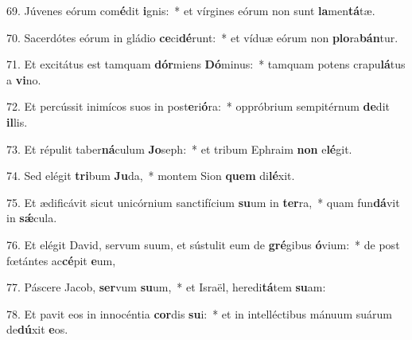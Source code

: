 69. Júvenes eórum com\textbf{é}dit \textbf{i}gnis:~*  et vírgines eórum non sunt \textbf{la}men\textbf{tá}tæ.\

70. Sacerdótes eórum in gládio \textbf{ce}ci\textbf{dé}runt:~*  et víduæ eórum non \textbf{plo}ra\textbf{bán}tur.\

71. Et excitátus est tamquam \textbf{dór}miens \textbf{Dó}minus:~*  tamquam potens crapu\textbf{lá}tus a \textbf{vi}no.\

72. Et percússit inimícos suos in post\textbf{e}ri\textbf{ó}ra:~*  oppróbrium sempitérnum \textbf{de}dit \textbf{il}lis.\

73. Et répulit taber\textbf{ná}culum \textbf{Jo}seph:~*  et tribum Ephraim \textbf{non} e\textbf{lé}git.\

74. Sed elégit \textbf{tri}bum \textbf{Ju}da,~*  montem Sion \textbf{quem} di\textbf{lé}xit.\

75. Et ædificávit sicut unicórnium sanctifícium \textbf{su}um in \textbf{ter}ra,~*  quam fun\textbf{dá}vit in \textbf{sǽ}cula.\

76. Et elégit David, servum suum, et sústulit eum de \textbf{gré}gibus \textbf{ó}vium:~*  de post fœtántes ac\textbf{cé}pit \textbf{e}um,\

77. Páscere Jacob, \textbf{ser}vum \textbf{su}um,~*  et Israël, heredi\textbf{tá}tem \textbf{su}am:\

78. Et pavit eos in innocéntia \textbf{cor}dis \textbf{su}i:~*  et in intelléctibus mánuum suárum de\textbf{dú}xit \textbf{e}os.\

